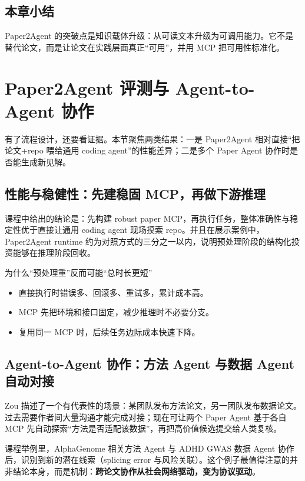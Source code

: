 \documentclass[a4paper]{article}
\begin{document}
\subsection{本章小结}

Paper2Agent 的突破点是知识载体升级：从可读文本升级为可调用能力。它不是替代论文，而是让论文在实践层面真正``可用''，并用 MCP 把可用性标准化。

\section{Paper2Agent 评测与 Agent-to-Agent 协作}

有了流程设计，还要看证据。本节聚焦两类结果：一是 Paper2Agent 相对直接``把论文+repo 喂给通用 coding agent''的性能差异；二是多个 Paper Agent 协作时是否能生成新见解。

\subsection{性能与稳健性：先建稳固 MCP，再做下游推理}

课程中给出的结论是：先构建 robust paper MCP，再执行任务，整体准确性与稳定性优于直接让通用 coding agent 现场摸索 repo。并且在展示案例中，Paper2Agent runtime 约为对照方式的三分之一以内，说明预处理阶段的结构化投资能够在推理阶段回收。

\begin{importantbox}{为什么``预处理重''反而可能``总时长更短''}
\begin{itemize}
    \item 直接执行时错误多、回滚多、重试多，累计成本高。
    \item MCP 先把环境和接口固定，减少推理时不必要分支。
    \item 复用同一 MCP 时，后续任务边际成本快速下降。
\end{itemize}
\end{importantbox}

\subsection{Agent-to-Agent 协作：方法 Agent 与数据 Agent 自动对接}

Zou 描述了一个有代表性的场景：某团队发布方法论文，另一团队发布数据论文。过去需要作者间大量沟通才能完成对接；现在可让两个 Paper Agent 基于各自 MCP 先自动探索``方法是否适配该数据''，再把高价值候选提交给人类复核。

课程举例里，AlphaGenome 相关方法 Agent 与 ADHD GWAS 数据 Agent 协作后，识别到新的潜在线索（splicing error 与风险关联）。这个例子最值得注意的并非结论本身，而是机制：\textbf{跨论文协作从社会网络驱动，变为协议驱动}。
\end{document}
